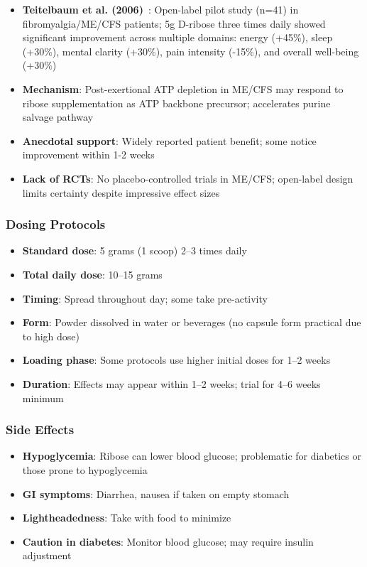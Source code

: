 \begin{itemize}
    \item \textbf{Teitelbaum et al. (2006)}~\cite{Teitelbaum2006ribose}: Open-label pilot study (n=41) in fibromyalgia/ME/CFS patients; 5g D-ribose three times daily showed significant improvement across multiple domains: energy (+45\%), sleep (+30\%), mental clarity (+30\%), pain intensity (-15\%), and overall well-being (+30\%)
    \item \textbf{Mechanism}: Post-exertional ATP depletion in ME/CFS may respond to ribose supplementation as ATP backbone precursor; accelerates purine salvage pathway
    \item \textbf{Anecdotal support}: Widely reported patient benefit; some notice improvement within 1-2 weeks
    \item \textbf{Lack of RCTs}: No placebo-controlled trials in ME/CFS; open-label design limits certainty despite impressive effect sizes
\end{itemize}

\subsubsection{Dosing Protocols}

\begin{itemize}
    \item \textbf{Standard dose}: 5 grams (1 scoop) 2--3 times daily
    \item \textbf{Total daily dose}: 10--15 grams
    \item \textbf{Timing}: Spread throughout day; some take pre-activity
    \item \textbf{Form}: Powder dissolved in water or beverages (no capsule form practical due to high dose)
    \item \textbf{Loading phase}: Some protocols use higher initial doses for 1--2 weeks
    \item \textbf{Duration}: Effects may appear within 1--2 weeks; trial for 4--6 weeks minimum
\end{itemize}

\subsubsection{Side Effects}

\begin{itemize}
    \item \textbf{Hypoglycemia}: Ribose can lower blood glucose; problematic for diabetics or those prone to hypoglycemia
    \item \textbf{GI symptoms}: Diarrhea, nausea if taken on empty stomach
    \item \textbf{Lightheadedness}: Take with food to minimize
    \item \textbf{Caution in diabetes}: Monitor blood glucose; may require insulin adjustment
\end{itemize}


